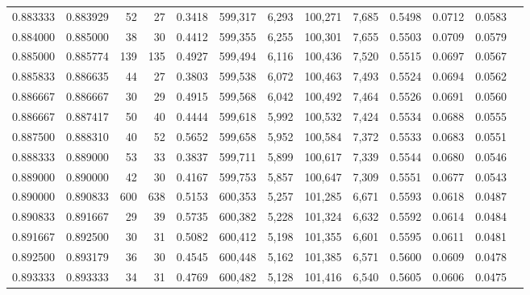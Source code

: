 \begin{tabular}{rrrrrrrrrrrrr}
0.883333 & 0.883929 &    52 &  27 &                                     0.3418 & 599,317 &   6,293 & 100,271 &   7,685 & 0.5498 & 0.0712 & 0.0583 \\
0.884000 & 0.885000 &    38 &  30 &                                     0.4412 & 599,355 &   6,255 & 100,301 &   7,655 & 0.5503 & 0.0709 & 0.0579 \\
0.885000 & 0.885774 &   139 & 135 &                                     0.4927 & 599,494 &   6,116 & 100,436 &   7,520 & 0.5515 & 0.0697 & 0.0567 \\
0.885833 & 0.886635 &    44 &  27 &                                     0.3803 & 599,538 &   6,072 & 100,463 &   7,493 & 0.5524 & 0.0694 & 0.0562 \\
0.886667 & 0.886667 &    30 &  29 &                                     0.4915 & 599,568 &   6,042 & 100,492 &   7,464 & 0.5526 & 0.0691 & 0.0560 \\
0.886667 & 0.887417 &    50 &  40 &                                     0.4444 & 599,618 &   5,992 & 100,532 &   7,424 & 0.5534 & 0.0688 & 0.0555 \\
0.887500 & 0.888310 &    40 &  52 &                                     0.5652 & 599,658 &   5,952 & 100,584 &   7,372 & 0.5533 & 0.0683 & 0.0551 \\
0.888333 & 0.889000 &    53 &  33 &                                     0.3837 & 599,711 &   5,899 & 100,617 &   7,339 & 0.5544 & 0.0680 & 0.0546 \\
0.889000 & 0.890000 &    42 &  30 &                                     0.4167 & 599,753 &   5,857 & 100,647 &   7,309 & 0.5551 & 0.0677 & 0.0543 \\
0.890000 & 0.890833 &   600 & 638 &                                     0.5153 & 600,353 &   5,257 & 101,285 &   6,671 & 0.5593 & 0.0618 & 0.0487 \\
0.890833 & 0.891667 &    29 &  39 &                                     0.5735 & 600,382 &   5,228 & 101,324 &   6,632 & 0.5592 & 0.0614 & 0.0484 \\
0.891667 & 0.892500 &    30 &  31 &                                     0.5082 & 600,412 &   5,198 & 101,355 &   6,601 & 0.5595 & 0.0611 & 0.0481 \\
0.892500 & 0.893179 &    36 &  30 &                                     0.4545 & 600,448 &   5,162 & 101,385 &   6,571 & 0.5600 & 0.0609 & 0.0478 \\
0.893333 & 0.893333 &    34 &  31 &                                     0.4769 & 600,482 &   5,128 & 101,416 &   6,540 & 0.5605 & 0.0606 & 0.0475 \\

\end{tabular}
